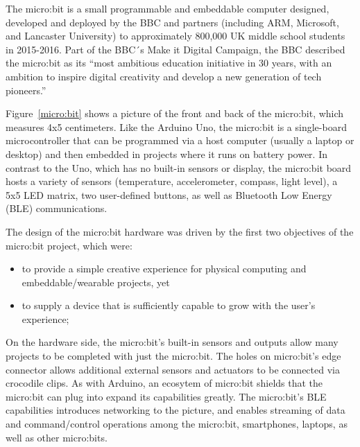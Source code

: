 


The micro:bit is a small programmable and embeddable computer designed, 
developed and deployed by the BBC and partners (including ARM, Microsoft, 
and Lancaster University) to approximately 800,000 UK middle school students
in 2015-2016. Part of the BBC´s Make it Digital Campaign, the BBC described the
micro:bit as its ``most ambitious education initiative in 30 years, 
with an ambition to inspire digital creativity and 
develop a new generation of tech pioneers.''~\cite{BBCwebsite}


Figure~\ref{micro:bit} shows a picture of the front and back of the
micro:bit, which measures 4x5 centimeters. Like the Arduino Uno,
the micro:bit is a single-board microcontroller that can be programmed
via a host computer (usually a laptop or desktop)
and then embedded in projects where it runs on battery power.
In contrast to the Uno, which has no built-in sensors or display, the micro:bit 
board hosts a variety of sensors (temperature, accelerometer, compass, light level), 
a 5x5 LED matrix, two user-defined buttons, as well as Bluetooth
Low Energy (BLE) communications.

The design of the micro:bit hardware was driven by the
first two objectives of the micro:bit project, which were:
\begin{itemize}
\item to provide a simple creative experience for physical computing and embeddable/wearable projects, yet
\item to supply a device that is sufficiently capable to grow with the user’s experience; 
\end{itemize}

On the hardware side, the micro:bit's built-in sensors and outputs allow many projects to 
be completed with just the micro:bit. The holes on micro:bit's edge
connector allows additional external sensors and actuators to be connected via crocodile clips.
As with Arduino, an ecosytem of micro:bit shields that the micro:bit can plug into expand
its capabilities greatly. The micro:bit's BLE capabilities introduces networking to the
picture, and enables streaming of data and command/control operations among the micro:bit, 
smartphones, laptops, as well as other micro:bits.

